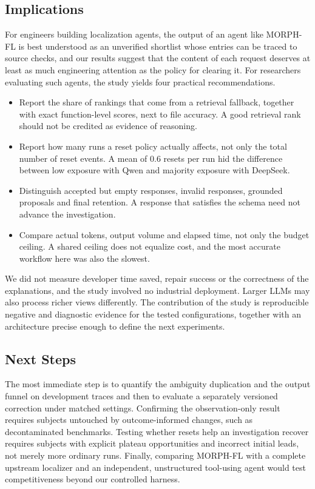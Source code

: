 \documentclass[a4paper,fleqn]{cas-sc}
\newcommand{\tool}{MORPH-FL}
\begin{document}
\subsection{Implications}
For engineers building localization agents, the output of an agent like \tool{} is best understood as an unverified shortlist whose entries can be traced to source checks, and our results suggest that the content of each request deserves at least as much engineering attention as the policy for clearing it. For researchers evaluating such agents, the study yields four practical recommendations.
\begin{itemize}
\item Report the share of rankings that come from a retrieval fallback, together with exact function-level scores, next to file accuracy. A good retrieval rank should not be credited as evidence of reasoning.
\item Report how many runs a reset policy actually affects, not only the total number of reset events. A mean of 0.6 resets per run hid the difference between low exposure with Qwen and majority exposure with DeepSeek.
\item Distinguish accepted but empty responses, invalid responses, grounded proposals and final retention. A response that satisfies the schema need not advance the investigation.
\item Compare actual tokens, output volume and elapsed time, not only the budget ceiling. A shared ceiling does not equalize cost, and the most accurate workflow here was also the slowest.
\end{itemize}
We did not measure developer time saved, repair success or the correctness of the explanations, and the study involved no industrial deployment. Larger LLMs may also process richer views differently. The contribution of the study is reproducible negative and diagnostic evidence for the tested configurations, together with an architecture precise enough to define the next experiments.

\subsection{Next Steps}
The most immediate step is to quantify the ambiguity duplication and the output funnel on development traces and then to evaluate a separately versioned correction under matched settings. Confirming the observation-only result requires subjects untouched by outcome-informed changes, such as decontaminated benchmarks. Testing whether resets help an investigation recover requires subjects with explicit plateau opportunities and incorrect initial leads, not merely more ordinary runs. Finally, comparing \tool{} with a complete upstream localizer and an independent, unstructured tool-using agent would test competitiveness beyond our controlled harness.
\end{document}
